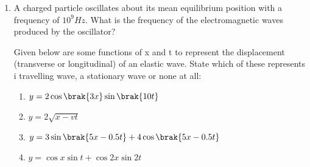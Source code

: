 \begin{enumerate}[label=\thesection.\arabic*,ref=\thesection.\theenumi]
\item A charged particle oscillates about its mean equilibrium position with a frequency of $10^9Hz$. What is the frequency of the electromagnetic waves produced by the oscillator?
\pagebreak
\solution

Given below are some functions of x and t to 
represent the displacement (transverse
or longitudinal) of an elastic wave. State which of these represents \brak i travelling
wave,  a stationary wave or  none at all: \\
\begin{enumerate}
\item $y = 2\cos \brak{3x} \sin \brak{10t}$
\item $y=2\sqrt{x-vt}$
\item $y = 3\sin \brak{5x - 0.5t} + 4\cos \brak{5x - 0.5t}$
\item $y = \cos x \sin t + \cos 2x \sin 2t$

\end{enumerate}
\solution

\end{enumerate}
